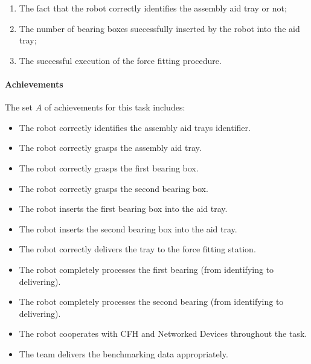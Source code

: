 \begin{enumerate}
\item The fact that the robot correctly identifies the assembly aid tray or not;
\item The number of bearing boxes successfully inserted by the robot into the aid tray;
\item The successful execution of the force fitting procedure.
\end{enumerate}

\noindent 
\paragraph{Achievements} The set $A$ of achievements for this task includes:
\begin{itemize}
\item The robot correctly identifies the assembly aid trays identifier.
\item The robot correctly grasps the assembly aid tray.
\item The robot correctly grasps the first bearing box.
\item The robot correctly grasps the second bearing box.
\item The robot inserts the first bearing box into the aid tray.
\item The robot inserts the second bearing box into the aid tray.
\item The robot correctly delivers the tray to the force fitting station.
\item The robot completely processes the first bearing (from identifying to delivering).
\item The robot completely processes the second bearing (from identifying to delivering).
\item The robot cooperates with CFH and Networked Devices throughout the task.
\item The team delivers the benchmarking data appropriately.
\end{itemize}
